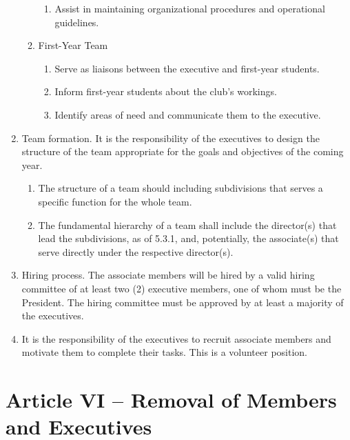 \documentclass[12pt,a4paper]{article}
\begin{document}
\begin{enumerate}
\begin{enumerate}
\begin{enumerate}
\item Assist in maintaining organizational procedures and operational guidelines.
\end{enumerate}

\item First-Year Team

\begin{enumerate}
\item Serve as liaisons between the executive and first-year students.

\item Inform first-year students about the club's workings.

\item Identify areas of need and communicate them to the executive.
\end{enumerate}
\end{enumerate}

\item Team formation. It is the responsibility of the executives to design the structure of the team appropriate for the goals and objectives of the coming year.

\begin{enumerate}
\item The structure of a team should including subdivisions that serves a specific function for the whole team.

\item The fundamental hierarchy of a team shall include the director(s) that lead the subdivisions, as of 5.3.1, and, potentially, the associate(s) that serve directly under the respective director(s).
\end{enumerate}

\item Hiring process. The associate members will be hired by a valid hiring committee of at least two (2) executive members, one of whom must be the President. The hiring committee must be approved by at least a majority of the executives.

\item It is the responsibility of the executives to recruit associate members and motivate them to complete their tasks. This is a volunteer position.
\end{enumerate}

\section*{Article VI – Removal of Members and Executives}
\end{document}

